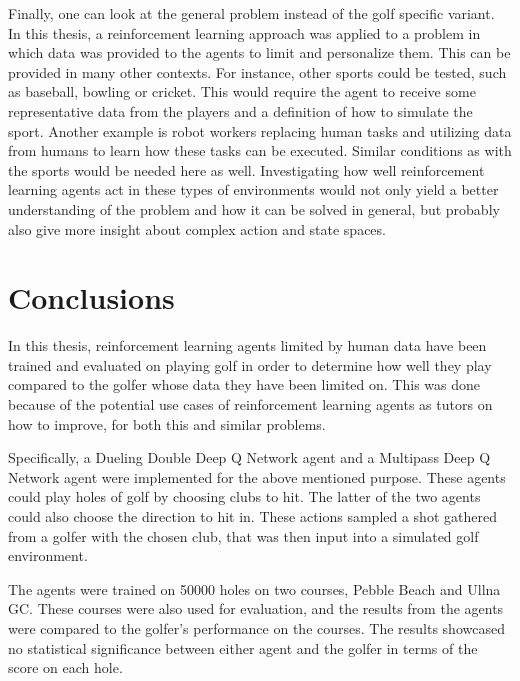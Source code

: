 \documentclass{kththesis}
\begin{document}
Finally, one can look at the general problem instead of the golf specific variant. In this thesis, a reinforcement learning approach was applied to a problem in which data was provided to the agents to limit and personalize them. This can be provided in many other contexts. For instance, other sports could be tested, such as baseball, bowling or cricket. This would require the agent to receive some representative data from the players and a definition of how to simulate the sport. Another example is robot workers replacing human tasks and utilizing data from humans to learn how these tasks can be executed. Similar conditions as with the sports would be needed here as well. Investigating how well reinforcement learning agents act in these types of environments would not only yield a better understanding of the problem and how it can be solved in general, but probably also give more insight about complex action and state spaces.

\chapter{Conclusions}
\label{chapter:conclusions}
In this thesis, reinforcement learning agents limited by human data have been trained and evaluated on playing golf in order to determine how well they play compared to the golfer whose data they have been limited on. This was done because of the potential use cases of reinforcement learning agents as tutors on how to improve, for both this and similar problems.

Specifically, a Dueling Double Deep Q Network agent and a Multipass Deep Q Network agent were implemented for the above mentioned purpose. These agents could play holes of golf by choosing clubs to hit. The latter of the two agents could also choose the direction to hit in. These actions sampled a shot gathered from a golfer with the chosen club, that was then input into a simulated golf environment. 

The agents were trained on 50000 holes on two courses, Pebble Beach and Ullna GC. These courses were also used for evaluation, and the results from the agents were compared to the golfer's performance on the courses. The results showcased no statistical significance between either agent and the golfer in terms of the score on each hole.
\end{document}
